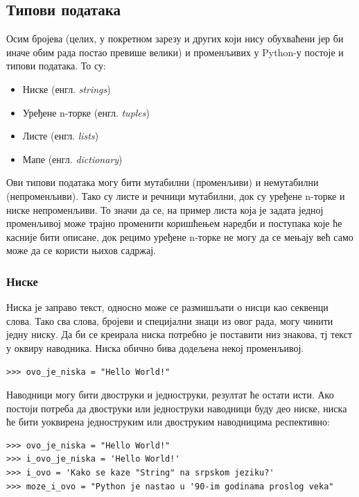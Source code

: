 \subsection{Типови података}
Осим бројева (целих, у покретном зарезу и других који нису обухваћени јер би иначе обим рада постао превише велики) и променљивих у Python-у постоје и типови података. То су:
\begin{itemize}
\item Ниске (енгл. \emph{strings})
\item Уређене n-торке (енгл. \emph{tuples})
\item Листе (енгл. \emph{lists})
\item Мапе (енгл. \emph{dictionary})
\end{itemize}

Ови типови података могу бити мутабилни (променљиви) и немутабилни (непроменљиви). Тако су листе и речници мутабилни, док су уређене n-торке и ниске непроменљиви. То значи да се, на пример листа која је задата једној променљивој може трајно променити коришћењем наредби и поступака које ће касније бити описане, док рецимо уређене n-торке не могу да се мењају већ само може да се користи њихов садржај.

\subsubsection{Ниске}

Ниска је заправо текст, односно може се размишљати о нисци као секвенци слова. Тако сва слова, бројеви и специјални знаци из овог рада, могу чинити једну ниску. Да би се креирала ниска потребно је поставити низ знакова, тј текст у оквиру наводника. Ниска обично бива додељена некој променљивој.

\begin{lstlisting}[caption = Креирање ниске, label = kreiranje_stringa]
>>> ovo_je_niska = "Hello World!"
\end{lstlisting}

Наводници могу бити двоструки и једноструки, резултат ће остати исти. Ако постоји потреба да двоструки или једноструки наводници буду део ниске, ниска ће бити уоквирена једноструким или двоструким наводницима респективно:

\begin{lstlisting}[caption = Примери креирања ниски, label = navodnici]
>>> ovo_je_niska = "Hello World!"
>>> i_ovo_je_niska = 'Hello World!'
>>> i_ovo = 'Kako se kaze "String" na srpskom jeziku?'
>>> moze_i_ovo = "Python je nastao u '90-im godinama proslog veka"
\end{lstlisting}


